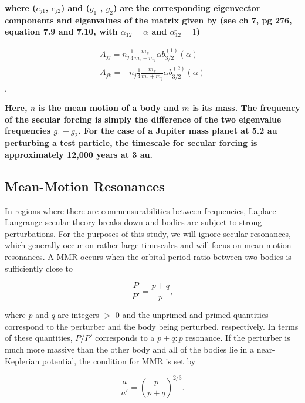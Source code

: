 \documentclass[fleqn,usenatbib]{mnras}
\begin{document}
\noindent \textbf{where  ($e_{j1}$, $e_{j2}$) and ($g_{1}$ , $g_{2}$) are the corresponding eigenvector components and eigenvalues of the matrix given by \citet{1999ssd..book.....M} (see ch 7, pg 276, equation 7.9 and 7.10, with $\alpha_{12} = \alpha$ and $\bar{\alpha_{12}} = 1$)}

\begin{eqnarray}\label{eq:pert_matrix}
	A_{jj} = n_{j} \frac{1}{4} \frac{m_{k}}{m_{c} + m_{j}} \alpha b_{3/2}^{(1)} (\alpha) \\ \nonumber
	A_{jk} = -n_{j} \frac{1}{4} \frac{m_{k}}{m_{c} + m_{j}} \alpha b_{3/2}^{(2)} (\alpha)
\end{eqnarray}.

\noindent \textbf{Here, $n$ is the mean motion of a body and $m$ is its mass. The frequency of the secular forcing is simply the difference of the two eigenvalue frequencies $g_{1} - g_{2}$. For the case of a Jupiter mass planet at 5.2 au perturbing a test particle, the timescale for secular forcing is approximately 12,000 years at 3 au.}

\subsection{Mean-Motion Resonances}\label{sec:mmr}

In regions where there are commensurabilities between frequencies, Laplace-Langrange secular theory breaks down and bodies are subject to strong 
perturbations. For the purposes of this study, we will ignore secular resonances, which generally occur on rather large timescales and will focus on 
mean-motion resonances. A MMR occurs  when the orbital period ratio between two bodies is sufficiently close to

\begin{equation}\label{eq:per_mmr}
	\frac{P}{P'} = \frac{p + q}{p},
\end{equation}

\noindent where  $p$ and $q$ are integers $>$ 0 and the unprimed and primed quantities correspond to the perturber and the body being perturbed, 
respectively. In terms of these quantities, $P/P'$ corresponds to a $p+q:p$ resonance. If the perturber is much more massive than the other body and all of the 
bodies lie in a near-Keplerian potential, the condition for MMR is set by

\begin{equation}\label{eq:a_mmr}
	\frac{a}{a'} = \left( \frac{p}{p + q} \right)^{2/3}.
\end{equation}
\end{document}
